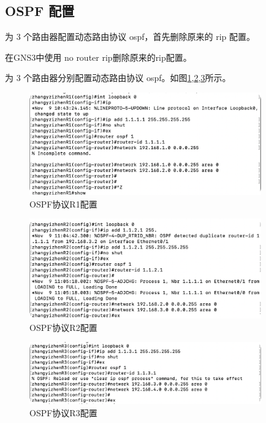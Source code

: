 \documentclass[a4paper,12pt]{report}
\begin{document}
\begin{spacing}{1.5}
\subsection{OSPF 配置}
为 3 个路由器配置动态路由协议 ospf，首先删除原来的 rip 配置。

在GNS3中使用 no router rip删除原来的rip配置。

为 3 个路由器分别配置动态路由协议 ospf。如图\ref{27},\ref{28},\ref{29}所示。

\begin{figure}[htb!]
  \centering
\includegraphics[width=10cm]{figure/ospf-r1.png}
  \caption{OSPF协议R1配置}
  \label{27}

\end{figure}

\begin{figure}[htb!]
  \centering
\includegraphics[width=10cm]{figure/ospf-r2.png}
\caption{OSPF协议R2配置}
\label{28}
\end{figure}

\begin{figure}[htb!]
  \centering
\includegraphics[width=10cm]{figure/ospf-r3.png}
\caption{ OSPF协议R3配置}
\label{29}
\end{figure}


\end{spacing}
\end{document}
